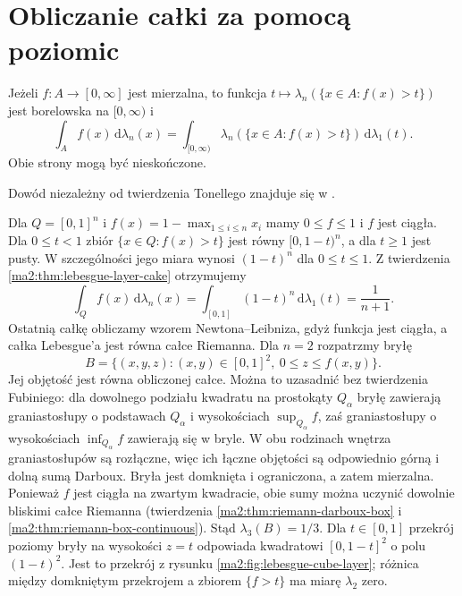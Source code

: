 \section{Obliczanie całki za pomocą poziomic}

\begin{twierdzenie}
\label{ma2:thm:lebesgue-layer-cake}
Jeżeli $f:A\to[0,\infty]$ jest mierzalna,
to funkcja $t\mapsto\lambda_n(\{x\in A:f(x)>t\})$
jest borelowska na $[0,\infty)$ i
\[
 \int_A f(x)\,\mathrm d\lambda_n(x)
 =
 \int_{[0,\infty)}
 \lambda_n(\{x\in A:f(x)>t\})\,\mathrm d\lambda_1(t).
\]
Obie strony mogą być nieskończone.
\end{twierdzenie}
Dowód niezależny od twierdzenia Tonellego
znajduje się w
.

\begin{przyklad}
\label{ma2:ex:lebesgue-cube-layer}
Dla $Q=[0,1]^n$ i
$f(x)=1-\max_{1\le i\le n}x_i$ mamy
$0\le f\le1$ i $f$ jest ciągła.
Dla $0\le t<1$ zbiór $\{x\in Q:f(x)>t\}$
jest równy $[0,1-t)^n$, a dla $t\ge1$
jest pusty. W szczególności jego miara
wynosi $(1-t)^n$ dla $0\le t\le1$.
Z twierdzenia \ref{ma2:thm:lebesgue-layer-cake}
otrzymujemy
\[
 \int_Q f(x)\,\mathrm d\lambda_n(x)
 =\int_{[0,1]}(1-t)^n\,\mathrm d\lambda_1(t)
 =\frac{1}{n+1}.
\]
Ostatnią całkę obliczamy wzorem
Newtona--Leibniza, gdyż funkcja jest ciągła,
a całka Lebesgue'a jest równa całce Riemanna.
Dla $n=2$ rozpatrzmy bryłę
\[
 B=\{(x,y,z):(x,y)\in[0,1]^2,\ 0\le z\le f(x,y)\}.
\]
Jej objętość jest równa obliczonej całce.
Można to uzasadnić bez twierdzenia Fubiniego:
dla dowolnego podziału kwadratu na prostokąty
$Q_\alpha$ bryłę zawierają graniastosłupy
o podstawach $Q_\alpha$ i wysokościach
$\sup_{Q_\alpha}f$, zaś graniastosłupy
o wysokościach $\inf_{Q_\alpha}f$
zawierają się w bryle. W obu rodzinach
wnętrza graniastosłupów są rozłączne,
więc ich łączne objętości są odpowiednio
górną i dolną sumą Darboux.
Bryła jest domknięta i ograniczona,
a zatem mierzalna. Ponieważ $f$ jest
ciągła na zwartym kwadracie, obie sumy
można uczynić dowolnie bliskimi całce
Riemanna (twierdzenia
\ref{ma2:thm:riemann-darboux-box}
i \ref{ma2:thm:riemann-box-continuous}).
Stąd $\lambda_3(B)=1/3$.
Dla $t\in[0,1]$ przekrój poziomy bryły
na wysokości $z=t$ odpowiada kwadratowi
$[0,1-t]^2$ o polu $(1-t)^2$.
Jest to przekrój z rysunku
\ref{ma2:fig:lebesgue-cube-layer}; różnica
między domkniętym przekrojem a zbiorem
$\{f>t\}$ ma miarę $\lambda_2$ zero.
\end{przyklad}

